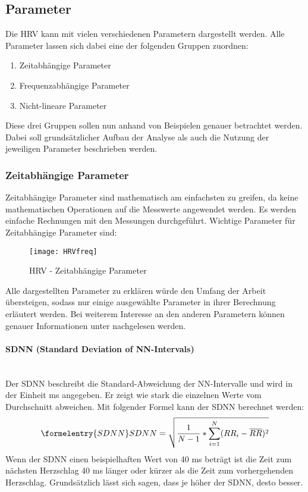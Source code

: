  \subsection{Parameter}
 
 Die HRV kann mit vielen verschiedenen Parametern dargestellt werden. Alle Parameter lassen sich dabei eine der folgenden Gruppen zuordnen:
 
 \begin{enumerate}
 	\item Zeitabhängige Parameter
 	\item Frequenzabhängige Parameter
 	\item Nicht-lineare Parameter
\end{enumerate}

Diese drei Gruppen sollen nun anhand von Beispielen genauer betrachtet werden. Dabei soll grundsätzlicher Aufbau der Analyse als auch die Nutzung der jeweiligen Parameter beschrieben werden.

\subsubsection{Zeitabhängige Parameter}	
Zeitabhängige Parameter sind mathematisch am einfachsten zu greifen, da keine mathematischen Operationen auf die Messwerte angewendet werden. Es werden einfache Rechnungen mit den Messungen durchgeführt. Wichtige Parameter für Zeitabhängige Parameter sind:   
 
 \begin{figure}[H]
 	\centering
 	\texttt{[image: HRVfreq]}
 	\caption{HRV - Zeitabhängige Parameter}
 	\label{fig:HRVfreq}
 	\cite[S.2]{med}
 \end{figure}
Alle dargestellten Parameter zu erklären würde den Umfang der Arbeit übersteigen, sodass nur einige ausgewählte Parameter in ihrer Berechnung erläutert werden. Bei weiterem Interesse an den anderen Parametern können genauer Informationen unter \cite{med} nachgelesen werden. 

\paragraph{SDNN (Standard Deviation of NN-Intervals)}\mbox{} \\
Der SDNN beschreibt die Standard-Abweichung der NN-Intervalle und wird in der Einheit ms angegeben. Er zeigt wie stark die einzelnen Werte vom Durchschnitt abweichen. Mit folgender Formel kann der SDNN berechnet werden: 
\begin{equation}\formelentry{SDNN}
SDNN = \sqrt{\dfrac{1}{N-1} * \sum\limits_{i=1}^{N}  (RR_i - \overline{RR})^{2}}
\end{equation}
Wenn der SDNN einen beispielhaften Wert von 40 ms beträgt ist die Zeit zum nächsten Herzschlag 40 ms länger oder kürzer als die Zeit zum vorhergehenden Herzschlag. Grundsätzlich lässt sich sagen, dass je höher der SDNN, desto besser.\\

